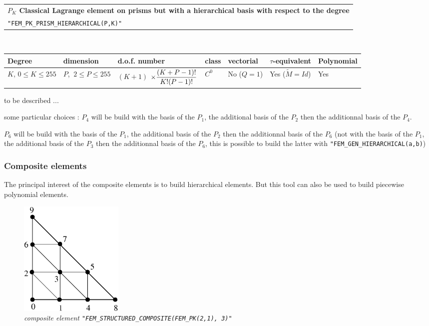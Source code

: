 \documentclass[11pt,a4paper]{article}
\begin{document}
\begin{center}
\begin{tabular}{|m{16.109cm}|} \hline 
{\bf $P_{K}$ Classical Lagrange element on prisms but with a hierarchical basis with respect to the degree}\\
{\tt "FEM\_PK\_PRISM\_HIERARCHICAL(P,K)"} 
\end{tabular} \\ \vspace{-1pt} 
\begin{tabular}{|m{2cm}|m{2cm}|m{2.5cm}|m{1.5cm}|m{1.5cm}|m{2cm}|m{2cm}|} \hline 
Degree & dimension & d.o.f. number & class & vectorial & \mbox{$\tau$-equivalent} & Polynomial\\ \hline
\small \mbox{$K$}, \small \mbox{$0 \leq K\leq 255$} & \small $P$, \mbox{$\ 2 \leq P \leq 255$} & \mbox{$(K+1)$} \mbox{$\times {\displaystyle\frac{\displaystyle(K+P-1)!}{\displaystyle K! (P-1)!}}$} & $C^0$ & No \mbox{($Q = 1$)} & Yes \mbox{($\tilde{M} = Id$)}  & Yes\\ \hline
\end{tabular}
\end{center}



to be described ...

some particular choices : $P_4$ will be build with the basis of the $P_1$, the additional basis of the $P_2$ then the additionnal basis of the $P_4$.

$P_6$ will be build  with the basis of the $P_1$, the additional basis of the $P_2$ then the additionnal basis of the $P_6$ (not with the basis of the $P_1$, 
the additional basis of the $P_3$ then the additionnal basis of the $P_6$, this is possible to build the latter with {\tt "FEM\_GEN\_HIERARCHICAL(a,b)})

\subsubsection{Composite elements}

The principal interest of the composite elements is to build hierarchical elements. But this tool can also be used to build piecewise polynomial elements.

\begin{figure}[H]
  \begin{center}
    \includegraphics[width=5cm,angle=0]{getfemlist_triangle_P1comp.eps}
  \end{center}
  \caption{ \it composite element {\tt "FEM\_STRUCTURED\_COMPOSITE(FEM\_PK(2,1), 3)"}} 
  \label{fig:triangle_comp}
\end{figure}
\end{document}
